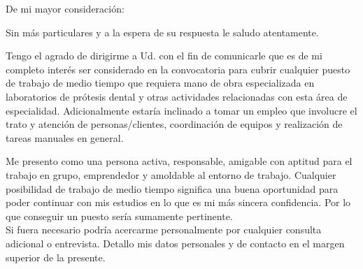 \documentclass[11pt,a4paper]{moderncv}
\begin{document}

\clearpage

\date{Córdoba, Viernes 4 de Agosto de 2014.}
\opening{De mi mayor consideración:}
\closing{Sin más particulares y a la espera de su respuesta le saludo atentamente.}
\makelettertitle

Tengo el agrado de dirigirme a Ud. con el fin de comunicarle que es de mi completo interés ser considerado en la convocatoria para cubrir cualquier puesto de trabajo de medio tiempo que requiera mano de obra especializada en laboratorios de prótesis dental y otras actividades relacionadas con esta área de especialidad. Adicionalmente estaría inclinado a tomar un empleo que involucre el trato y atención de personas/clientes, coordinación de equipos y realización de tareas manuales en general.  %

Me presento como una persona activa, responsable, amigable con aptitud para el trabajo en grupo, emprendedor y amoldable al entorno de trabajo.
Cualquier posibilidad de trabajo de medio tiempo significa una buena oportunidad para poder continuar con mis estudios en lo que es mi más sincera confidencia. Por lo que conseguir un puesto sería sumamente pertinente.\\
Si fuera necesario podría acercarme personalmente por cualquier consulta adicional o entrevista. Detallo mis datos personales y de contacto en el margen superior de la presente.



\makeletterclosing
\end{document}
